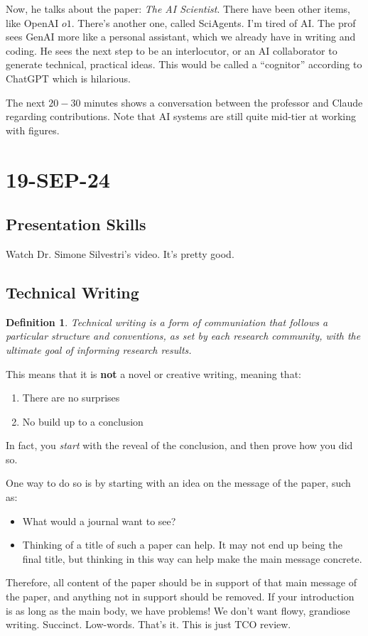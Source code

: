 \documentclass[10pt, oneside]{article}
\newtheorem{defn}{Definition}
\begin{document}
Now, he talks about the paper: \textit{The AI Scientist}. There have been other items, like OpenAI $o1$. There's another one, called SciAgents. I'm tired of AI. The prof sees GenAI more like a personal assistant, which we already have in writing and coding. He sees the next step to be an interlocutor, or an AI collaborator to generate technical, practical ideas. This would be called a ``cognitor'' according to ChatGPT which is hilarious. 

The next $20-30$ minutes shows a conversation between the professor and Claude regarding contributions. Note that AI systems are still quite mid-tier at working with figures. 

\section{19-SEP-24}
\subsection{Presentation Skills}
Watch Dr. Simone Silvestri's video. It's pretty good. 
\subsection{Technical Writing}
\begin{defn}
    Technical writing is a form of communiation that follows a particular structure and conventions, as set by each research community, with the ultimate goal of informing research results.
\end{defn}
This means that it is \textbf{not} a novel or creative writing, meaning that:
\begin{enumerate}
    \item There are no surprises
    \item No build up to a conclusion
\end{enumerate}
In fact, you \textit{start} with the reveal of the conclusion, and then prove how you did so. 

One way to do so is by starting with an idea on the message of the paper, such as:
\begin{itemize}
    \item What would a journal want to see?
    \item Thinking of a title of such a paper can help. It may not end up being the final title, but thinking in this way can help make the main message concrete. 
\end{itemize}
Therefore, all content of the paper should be in support of that main message of the paper, and anything not in support should be removed. If your introduction is as long as the main body, we have problems! We don't want flowy, grandiose writing. Succinct. Low-words. That's it. 
This is just TCO review. 
\end{document}
